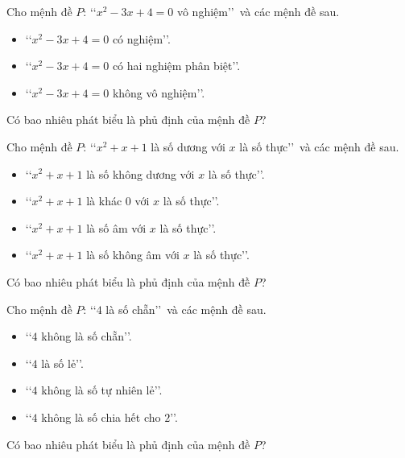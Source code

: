 
\begin{bt}%
	Cho mệnh đề $P$: \lq\lq $x^2-3x+4=0$  vô nghiệm\rq\rq\ và các mệnh đề sau.
	\begin{itemize}
		\item  \lq\lq $x^2-3x+4=0$ có nghiệm\rq\rq.
		\item \lq\lq $x^2-3x+4=0$ có hai nghiệm phân  biệt\rq\rq.
		\item \lq\lq $x^2-3x+4=0$ không vô nghiệm\rq\rq. 
	\end{itemize}
	 Có bao nhiêu phát biểu là phủ định của mệnh đề $P$?
\end{bt}

\begin{bt}%
	Cho mệnh đề $P$: \lq\lq $x^2+x+1$ là số dương với $x$ là số thực\rq\rq\ và các  mệnh đề sau.
	\begin{itemize}
		\item \lq\lq $x^2+x+1$  là số không dương với $x$ là số thực\rq\rq.
		\item \lq\lq $x^2+x+1$ là khác $0$ với $x$ là số thực\rq\rq. 
		\item \lq\lq $x^2+x+1$ là số âm với $x$ là số thực\rq\rq. 
		\item \lq\lq $x^2+x+1$  là số không âm với $x$ là số thực\rq\rq.
	\end{itemize}
	Có bao nhiêu phát biểu là phủ định của mệnh  đề $P$?
\end{bt}

\begin{bt}%
	Cho mệnh đề $P$: \lq\lq $4$  là số chẵn\rq\rq\ và các mệnh đề sau.
	\begin{itemize}
		\item \lq\lq $4$ không là số  chẵn\rq\rq.
		\item \lq\lq $4$ là số  lẻ\rq\rq.
		\item \lq\lq $4$ không là số tự  nhiên lẻ\rq\rq.
		\item  \lq\lq $4$ không là số chia hết cho $2$\rq\rq.
	\end{itemize}
	Có bao nhiêu phát biểu là phủ định của mệnh đề  $P$?
\end{bt}

